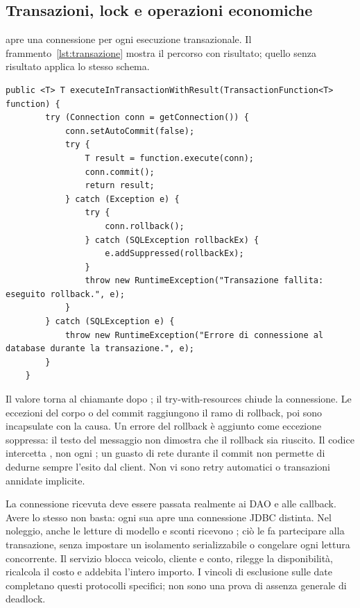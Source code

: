 \subsection{Transazioni, lock e operazioni economiche}
 apre una connessione per ogni esecuzione
transazionale. Il frammento~\ref{lst:transazione} mostra il percorso con
risultato; quello senza risultato applica lo stesso schema.

\noindent\begin{minipage}{\linewidth}
\begin{lstlisting}[firstnumber=88,caption={\code{DatabaseManager.java}: commit, tentativo di rollback e conservazione delle cause.},
  label=lst:transazione]
    public <T> T executeInTransactionWithResult(TransactionFunction<T> function) {
        try (Connection conn = getConnection()) {
            conn.setAutoCommit(false);
            try {
                T result = function.execute(conn);
                conn.commit();
                return result;
            } catch (Exception e) {
                try {
                    conn.rollback();
                } catch (SQLException rollbackEx) {
                    e.addSuppressed(rollbackEx);
                }
                throw new RuntimeException("Transazione fallita: eseguito rollback.", e);
            }
        } catch (SQLException e) {
            throw new RuntimeException("Errore di connessione al database durante la transazione.", e);
        }
    }
\end{lstlisting}
\end{minipage}


Il valore torna al chiamante dopo ; il try-with-resources
chiude la connessione. Le eccezioni del corpo o del commit raggiungono
il ramo di rollback, poi sono incapsulate con la causa. Un errore del
rollback è aggiunto come eccezione soppressa: il testo del messaggio
non dimostra che il rollback sia riuscito. Il codice intercetta
, non ogni ; un guasto di rete durante il
commit non permette di dedurne sempre l'esito dal client. Non vi sono
retry automatici o transazioni annidate implicite.

La connessione ricevuta deve essere passata realmente ai DAO e alle
callback. Avere lo stesso  non basta: ogni sua
 apre una connessione JDBC distinta. Nel noleggio,
anche le letture di modello e sconti ricevono ; ciò le fa
partecipare alla transazione, senza impostare un isolamento serializzabile
o congelare ogni lettura concorrente. Il servizio blocca veicolo,
cliente e conto, rilegge la disponibilità, ricalcola il costo e addebita
l'intero importo. I vincoli di esclusione sulle date completano questi
protocolli specifici; non sono una prova di assenza generale di deadlock.

